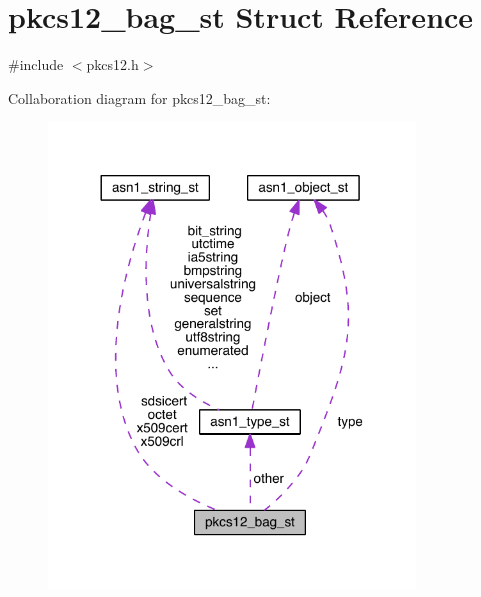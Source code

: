 \hypertarget{structpkcs12__bag__st}{}\section{pkcs12\+\_\+bag\+\_\+st Struct Reference}
\label{structpkcs12__bag__st}


{\ttfamily \#include $<$pkcs12.\+h$>$}



Collaboration diagram for pkcs12\+\_\+bag\+\_\+st\+:\nopagebreak
\begin{figure}[H]
\begin{center}
\leavevmode
\includegraphics[width=276pt]{structpkcs12__bag__st__coll__graph}
\end{center}
\end{figure}
